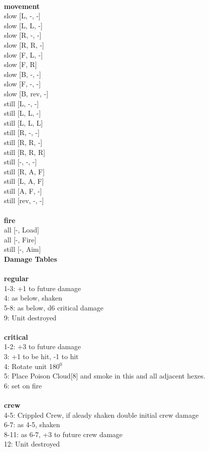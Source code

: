 \ \\ {\bf movement } \\
slow [L, -, -] \\
slow [L, L, -] \\
slow [R, -, -] \\
slow [R, R, -] \\
slow [F, L, -] \\
slow [F, R] \\
slow [B, -, -] \\
slow [F, -, -] \\
slow [B, rev, -] \\
still [L, -, -] \\
still [L, L, -] \\
still [L, L, L] \\
still [R, -, -] \\
still [R, R, -] \\
still [R, R, R] \\
still [-, -, -] \\
still [R, A, F] \\
still [L, A, F] \\
still [A, F, -] \\
still [rev, -, -] \\
\ \\ {\bf fire } \\
all [-, Load] \\
all [-, Fire] \\
still [-, Aim] \\


{\bf Damage Tables} \\
\ \\ {\bf regular } \\
1-3: +1 to future damage \\
4: as below, shaken \\
5-8: as below, d6 critical damage \\
9: Unit destroyed \\
\ \\ {\bf critical } \\
1-2: +3 to future damage \\
3: +1 to be hit, -1 to hit \\
4: Rotate unit 180$^0$ \\
5: Place Poison Cloud[8] and smoke in this and all adjacent hexes. \\
6: set on fire \\
\ \\ {\bf crew } \\
4-5: Crippled Crew, if aleady shaken double initial crew damage \\
6-7: as 4-5, shaken \\
8-11: as 6-7, +3 to future crew damage \\
12: Unit destroyed \\


